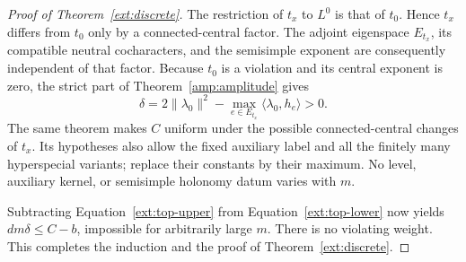 \begin{proof}[Proof of Theorem~\ref{ext:discrete}]
 The restriction of $t_x$ to $L^0$ is that of $t_0$.  Hence $t_x$ differs
 from $t_0$ only by a connected-central factor.  The adjoint eigenspace
 $E_{t_x}$, its compatible neutral cocharacters, and the semisimple
 exponent are consequently independent of that factor.  Because
 $t_0$ is a violation and its central exponent is zero, the strict part
 of Theorem~\ref{amp:amplitude} gives
 \[
     \delta=2\|\lambda_0\|^2-
          \max_{e\in E_{t_x}}\langle\lambda_0,h_e\rangle>0.
 \]
 The same theorem makes $C$ uniform under the possible connected-central
 changes of $t_x$.  Its hypotheses also allow the fixed auxiliary label
 and all the finitely many hyperspecial variants; replace their
 constants by their maximum.  No level, auxiliary kernel, or
 semisimple holonomy datum varies with $m$.

 Subtracting Equation~\eqref{ext:top-upper} from
 Equation~\eqref{ext:top-lower} now yields
 $dm\delta\le C-b$, impossible for arbitrarily large $m$.
 There is no violating weight.  This completes the induction and the
 proof of Theorem~\ref{ext:discrete}.
\end{proof}
